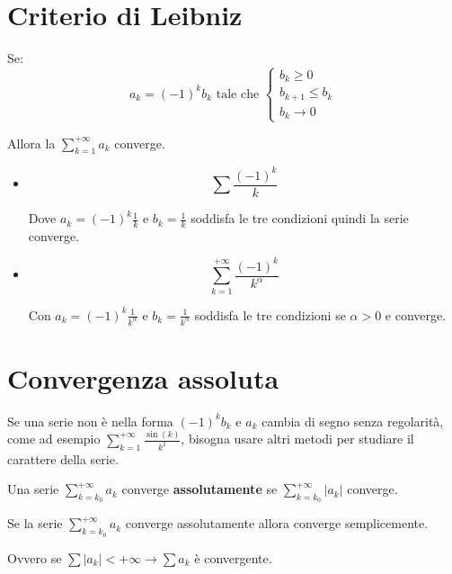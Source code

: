 \section{Criterio di Leibniz}
Se:
$$a_k=(-1)^kb_k\text{ tale che }\begin{cases}
    b_k\geq0\\
    b_{k+1}\leq b_k\\
    b_k\to 0
\end{cases}$$

Allora la $\sum^{+\infty}_{k=1}a_k$ converge.

\begin{example}
    \begin{itemize}
        \item \begin{equation*}\sum\frac{(-1)^k}{k}\end{equation*}
        
        Dove $a_k=(-1)^k\frac{1}{k}$ e $b_k=\frac{1}{k}$ soddisfa le tre condizioni quindi la serie converge.
        
        \item \begin{equation*}\sum^{+\infty}_{k=1}\frac{(-1)^k}{k^\alpha}\end{equation*}
        
        Con $a_k=(-1)^k\frac{1}{k^\alpha}$ e $b_k=\frac{1}{k^\alpha}$ soddisfa le tre condizioni se $\alpha>0$ e converge.
        
    \end{itemize}
\end{example}

\section{Convergenza assoluta}
Se una serie non è nella forma $(-1)^kb_k$ e $a_k$ cambia di segno senza regolarità, come ad esempio $\sum^{+\infty}_{k=1}\frac{\sin(k)}{k^2}$, bisogna usare altri metodi per studiare il carattere della serie.

Una serie $\sum^{+\infty}_{k=k_0}a_k$ converge \textbf{assolutamente} se $\sum^{+\infty}_{k=k_0}|a_k|$ converge.
\begin{thm}
    Se la serie $\sum^{+\infty}_{k=k_0}a_k$ converge assolutamente allora converge semplicemente.
    
    Ovvero se $\sum|a_k|<+\infty\to\sum a_k$ è convergente.
\end{thm}

